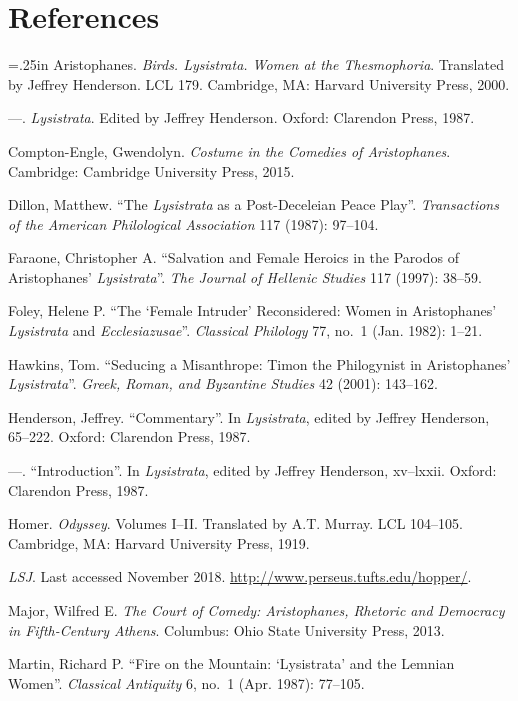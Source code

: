 \documentclass[12pt]{article}
\makeatletter
\newcommand{\hangpara}[2]{\hangindent#1\hangafter#2\noindent}
\newenvironment{hangparas}[2]{\setlength{\parindent}{\z@}%
  \everypar={\hangpara{#1}{#2}}}{\par}
\makeatother
\begin{document}
\section{References}
\begin{singlespacing}
\begin{hangparas}{.25in}{1}
Aristophanes. \textit{Birds. Lysistrata. Women at the Thesmophoria}. Translated by Jeffrey Henderson. LCL 179. Cambridge, MA: Harvard University Press, 2000.

---. \textit{Lysistrata}. Edited by Jeffrey Henderson. Oxford: Clarendon Press, 1987.

Compton-Engle, Gwendolyn. \textit{Costume in the Comedies of Aristophanes}. Cambridge: Cambridge University Press, 2015.

Dillon, Matthew. ``The \textit{Lysistrata} as a Post-Deceleian Peace Play''. \textit{Transactions of the American Philological Association} 117 (1987): 97--104.

Faraone, Christopher A. ``Salvation and Female Heroics in the Parodos of Aristophanes' \textit{Lysistrata}''. \textit{The Journal of Hellenic Studies} 117 (1997): 38--59.

Foley, Helene P. ``The `Female Intruder' Reconsidered: Women in Aristophanes' \textit{Lysistrata} and \textit{Ecclesiazusae}''. \textit{Classical Philology} 77, no.~1 (Jan. 1982): 1--21.

Hawkins, Tom. ``Seducing a Misanthrope: Timon the Philogynist in Aristophanes' \textit{Lysistrata}''. \textit{Greek, Roman, and Byzantine Studies} 42 (2001): 143--162.

Henderson, Jeffrey. ``Commentary''. In \textit{Lysistrata}, edited by Jeffrey Henderson, 65--222. Oxford: Clarendon Press, 1987.

---. ``Introduction''. In \textit{Lysistrata}, edited by Jeffrey Henderson, xv--lxxii. Oxford: Clarendon Press, 1987.

Homer. \textit{Odyssey}. Volumes I--II. Translated by A.T. Murray. LCL 104--105. Cambridge, MA: Harvard University Press, 1919.

\textit{LSJ}. Last accessed November 2018. \url{http://www.perseus.tufts.edu/hopper/}.

Major, Wilfred E. \textit{The Court of Comedy: Aristophanes, Rhetoric and Democracy in Fifth-Century Athens}. Columbus: Ohio State University Press, 2013.

Martin, Richard P. ``Fire on the Mountain: `Lysistrata' and the Lemnian Women''. \textit{Classical Antiquity} 6, no.~1 (Apr. 1987): 77--105.


\end{hangparas}
\end{singlespacing}
\end{document}
